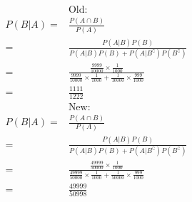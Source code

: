 \documentclass{article}
\begin{document}
\begin{equation*}
    \begin{split}
        &\text{Old}:\\
        P(B|A)=&\frac{P(A\cap B)}{P(A)}\\
        =&\frac{P(A|B)P(B)}{P(A|B)P(B)+P(A|B^\complement)P(B^\complement)}\\
        =&\frac{\frac{9999}{10000}\times\frac{1}{1000}}{\frac{9999}{10000}\times\frac{1}{1000}+\frac{1}{10000}\times\frac{999}{1000}}\\
        =&\frac{1111}{1222}\\
        &\text{New}:\\
        P(B|A)=&\frac{P(A\cap B)}{P(A)}\\
        =&\frac{P(A|B)P(B)}{P(A|B)P(B)+P(A|B^\complement)P(B^\complement)}\\
        =&\frac{\frac{49999}{50000}\times\frac{1}{1000}}{\frac{49999}{50000}\times\frac{1}{1000}+\frac{1}{50000}\times\frac{999}{1000}}\\
        =&\frac{49999}{50998}\\
    \end{split}
\end{equation*}
\end{document}
